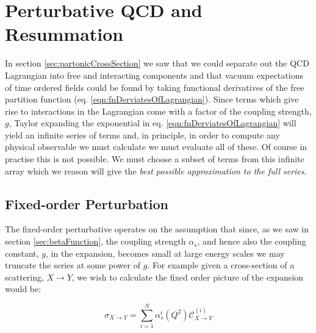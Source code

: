 \section{Perturbative QCD and Resummation}

	In section \ref{sec:partonicCrossSection} we saw that we could separate out the QCD Lagrangian into
	free and interacting components and that vacuum expectations of time ordered fields could be found by
	taking functional derivatives of the free partition function (eq. \eqref{eqn:fnDerviatesOfLagrangian}).
	Since terms which give rise to interactions in the Lagrangian come with a factor of the coupling strength,
	$g$, Taylor expanding the exponential in eq. \eqref{eqn:fnDerviatesOfLagrangian} will yield an infinite
	series of terms and, in principle, in order to compute any physical observable we must calculate we must
	evaluate all of these.  Of course in practise this is not possible.  We must choose a subset of terms from
	this infinite array which we reason will give the \emph{best possible approximation to the full series}.

	\subsection{Fixed-order Perturbation}

		The fixed-order perturbative operates on the assumption that since, as we saw in section \ref{sec:betaFunction},
		the coupling strength $\alpha_s$, and hence also the coupling constant, $g$, in the expansion, becomes small at
		large energy scales we may truncate the series at some power of $g$.  For example given a cross-section of a
		scattering, $X\rightarrow Y$, we wish to calculate the fixed order picture of the expansion would be:

		\begin{equation}
			\sigma_{X\rightarrow Y} = \sum_{i=1}^N\alpha_s^{i}(Q^2)\mathcal{C}^{(i)}_{X\rightarrow Y}
		\end{equation}

